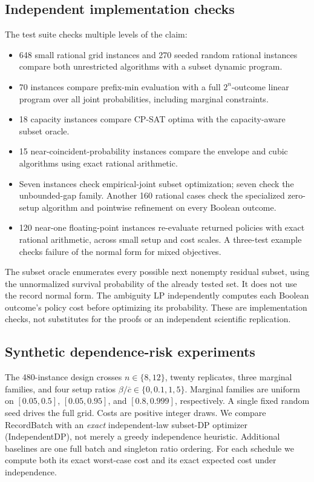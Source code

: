 \documentclass[runningheads]{llncs}
\begin{document}
\subsection{Independent implementation checks}
The test suite checks multiple levels of the claim:
\begin{itemize}
\item 648 small rational grid instances and 270 seeded random rational
instances compare both unrestricted algorithms with a subset dynamic program.
\item 70 instances compare prefix-min evaluation with a full $2^n$-outcome
linear program over all joint probabilities, including marginal constraints.
\item 18 capacity instances compare CP-SAT optima with the capacity-aware
subset oracle.
\item 15 near-coincident-probability instances compare the envelope and
cubic algorithms using exact rational arithmetic.
\item Seven instances check empirical-joint subset optimization; seven check
the unbounded-gap family. Another 160 rational cases check the specialized
zero-setup algorithm and pointwise refinement on every Boolean outcome.
\item 120 near-one floating-point instances re-evaluate returned policies
with exact rational arithmetic, across small setup and cost scales. A
three-test example checks failure of the normal form for mixed objectives.
\end{itemize}
The subset oracle enumerates every possible next nonempty residual subset,
using the unnormalized survival probability of the already tested set.
It does not use the record normal form. The ambiguity LP independently
computes each Boolean outcome's policy cost before optimizing its probability.
These are implementation checks, not substitutes for the proofs or an
independent scientific replication.

\subsection{Synthetic dependence-risk experiments}
The 480-instance design crosses $n\in\{8,12\}$, twenty replicates, three marginal
families, and four setup ratios
$\beta/\overline c\in\{0,0.1,1,5\}$. Marginal families are uniform on
$[0.05,0.5]$, $[0.05,0.95]$, and $[0.8,0.999]$, respectively.
A single fixed random seed drives the full grid.
Costs are positive integer draws. We compare RecordBatch with an
\emph{exact} independent-law subset-DP optimizer (IndependentDP), not merely
a greedy independence heuristic. Additional baselines are one full batch
and singleton ratio ordering. For each schedule we compute both its exact
worst-case cost and its exact expected cost under independence.
\end{document}
